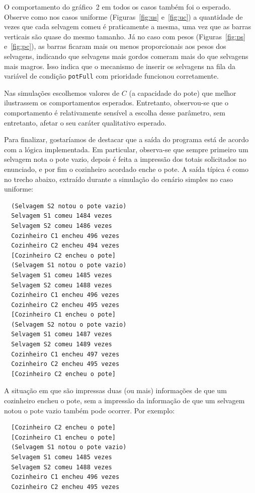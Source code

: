 \documentclass[11pt,a4paper]{article}
\begin{document}
O comportamento do gráfico~2 em todos os casos também foi o esperado. Observe como nos casos 
uniforme (Figuras~\ref{fig:us} e~\ref{fig:uc}) a quantidade de vezes que cada selvagem comeu é 
praticamente a mesma, uma vez que as barras verticais são quase do mesmo tamanho. Já no caso com 
pesos (Figuras~\ref{fig:ps} e~\ref{fig:pc}), as barras ficaram mais ou menos proporcionais aos pesos 
dos selvagens, indicando que selvagens mais gordos comeram mais do que selvagens mais magros. Isso 
indica que o mecanismo de inserir os selvagens na fila da variável de condição \verb|potFull| com 
prioridade funcionou corretamente.

Nas simulações escolhemos valores de $C$ (a capacidade do pote) que melhor ilustrassem os 
comportamentos esperados. Entretanto, observou-se que o comportamento é relativamente sensível a 
escolha desse parâmetro, sem entretanto, afetar o seu caráter qualitativo esperado.

Para finalizar, gostaríamos de destacar que a saída do programa está de acordo com a lógica 
implementada. Em particular, observa-se que sempre primeiro um selvagem nota o pote vazio, depois
é feita a impressão dos totais solicitados no enunciado, e por fim o cozinheiro acordado enche o 
pote. A saída típica é como no trecho abaixo, extraído durante a simulação do cenário simples no 
caso uniforme:

\begin{verbatim}
  (Selvagem S2 notou o pote vazio)
  Selvagem S1 comeu 1484 vezes
  Selvagem S2 comeu 1486 vezes
  Cozinheiro C1 encheu 496 vezes
  Cozinheiro C2 encheu 494 vezes
  [Cozinheiro C2 encheu o pote]
  (Selvagem S1 notou o pote vazio)
  Selvagem S1 comeu 1485 vezes
  Selvagem S2 comeu 1488 vezes
  Cozinheiro C1 encheu 496 vezes
  Cozinheiro C2 encheu 495 vezes
  [Cozinheiro C1 encheu o pote]
  (Selvagem S2 notou o pote vazio)
  Selvagem S1 comeu 1487 vezes
  Selvagem S2 comeu 1489 vezes
  Cozinheiro C1 encheu 497 vezes
  Cozinheiro C2 encheu 495 vezes
  [Cozinheiro C2 encheu o pote]
\end{verbatim}

A situação em que são impressas duas (ou mais) informações de que um cozinheiro encheu o pote, sem
a impressão da informação de que um selvagem notou o pote vazio também pode ocorrer. Por exemplo:

\begin{verbatim}
  [Cozinheiro C2 encheu o pote]
  [Cozinheiro C1 encheu o pote] 
  (Selvagem S1 notou o pote vazio)
  Selvagem S1 comeu 1485 vezes
  Selvagem S2 comeu 1488 vezes
  Cozinheiro C1 encheu 496 vezes
  Cozinheiro C2 encheu 495 vezes
\end{verbatim}
\end{document}
